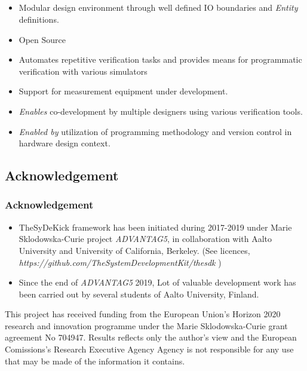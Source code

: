 \documentclass{sdkslides}
\begin{document}
\subsection*{\sectionname}
\begin{frame}[t]
    \frametitle{\sectionname}
    \begin{itemize}
        \item Modular design environment through well defined IO boundaries and
            \emph{Entity} definitions.
        \item Open Source
        \item Automates repetitive verification tasks and provides means for programmatic
            verification with various simulators
        \item Support for measurement equipment under development.
        \item \emph{Enables} co-development by multiple designers using various
            verification tools.
        \item \emph{Enabled by} utilization of programming methodology and
            version control in hardware design context.
    \end{itemize}
\end{frame}

\renewcommand{\sectionname}{Acknowledgement}
\subsection*{\sectionname}
\begin{frame}[t]
    \frametitle{\sectionname}
    \begin{itemize}

        \item TheSyDeKick framework has been initiated during 2017-2019 under Marie
            Sklodowska-Curie project \emph{ADVANTAG5}, in collaboration with Aalto
            University and University of California, Berkeley. (See licences,
                \emph{https://github.com/TheSystemDevelopmentKit/thesdk}
            )
        \item Since the end of  \emph{ADVANTAG5} 2019, Lot of valuable
            development work has been carried out by several students of Aalto
            University, Finland.  
    \end{itemize} 

    \vfill

    \tiny{This project has received funding from the European Union’s
        Horizon 2020 research and innovation programme under the Marie
        Sklodowska-Curie grant agreement No 704947. Results reflects only
        the author's view and the European Comissions's Research Executive
        Agency Agency is not responsible for any use that may be made of
    the information it contains. }
\end{frame}
\end{document}
